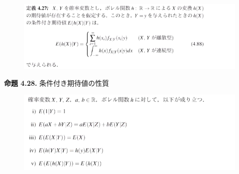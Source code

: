 \documentclass[dvipdfmx,10pt, a4j]{jarticle}
\theoremstyle{definition}
\begin{document}
\noindent
\begin{figure}[htbp]
\includegraphics[width=\linewidth]{D_11/teigi/4_27.png}
\end{figure}

\noindent
\textbf{命題 4.28.} 条件付き期待値の性質\\
\begin{figure}[htbp]
\includegraphics[width=\linewidth]{D_11/meidai/4_28.png}
\end{figure}
\end{document}
